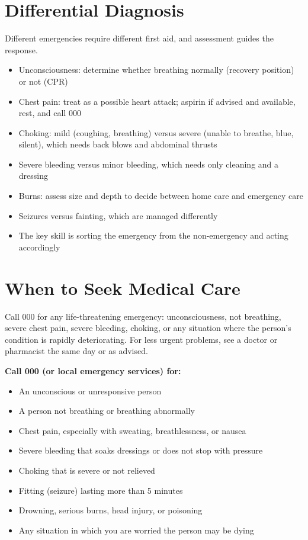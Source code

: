 \section*{Differential Diagnosis}
Different emergencies require different first aid, and assessment guides the response.
\begin{itemize}
    \item Unconsciousness: determine whether breathing normally (recovery position) or not (CPR)
    \item Chest pain: treat as a possible heart attack; aspirin if advised and available, rest, and call 000
    \item Choking: mild (coughing, breathing) versus severe (unable to breathe, blue, silent), which needs back blows and abdominal thrusts
    \item Severe bleeding versus minor bleeding, which needs only cleaning and a dressing
    \item Burns: assess size and depth to decide between home care and emergency care
    \item Seizures versus fainting, which are managed differently
    \item The key skill is sorting the emergency from the non-emergency and acting accordingly
\end{itemize}

\section*{When to Seek Medical Care}
Call 000 for any life-threatening emergency: unconsciousness, not breathing, severe chest pain, severe bleeding, choking, or any situation where the person's condition is rapidly deteriorating. For less urgent problems, see a doctor or pharmacist the same day or as advised.

\textbf{Call 000 (or local emergency services) for:}
\begin{itemize}
    \item An unconscious or unresponsive person
    \item A person not breathing or breathing abnormally
    \item Chest pain, especially with sweating, breathlessness, or nausea
    \item Severe bleeding that soaks dressings or does not stop with pressure
    \item Choking that is severe or not relieved
    \item Fitting (seizure) lasting more than 5 minutes
    \item Drowning, serious burns, head injury, or poisoning
    \item Any situation in which you are worried the person may be dying
\end{itemize}

